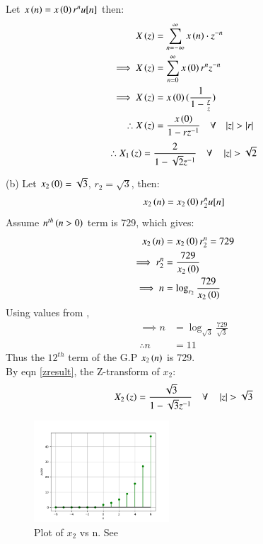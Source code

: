 \documentclass[journal,12pt,twocolumn]{IEEEtran}
\theoremstyle{remark}
\begin{document}
Let $x\left(n\right) = x\left(0\right)r^nu[n]$ then:
\begin{align}
    X\left(z\right) &= \sum_{n = -\infty}^{\infty}{x\left(n\right) \cdot z^{-n}}\\
    \implies X\left(z\right) &= \sum_{n = 0}^{\infty}{x\left(0\right)r^{n}z^{-n}}\\
    \implies X\left(z\right) &= x\left(0\right)(\frac{1}{1 - \frac{r}{z}})\\
	\therefore X\left(z\right) &= \frac{x\left(0\right)}{1 - rz^{-1}} \quad \forall \quad {\left\vert z\right\vert > \left\vert r\right\vert} \label{zresult}
\end{align}
\begin{align}
    \therefore X_1\left(z\right) = \frac{2}{1 - \sqrt{2}z^{-1}} \quad \forall \quad \left\vert z\right\vert > \sqrt{2}
\end{align}

(b) Let $x_2\left(0\right) = \sqrt{3}$, $r_2 = \sqrt{3}$, then:
\begin{align}
    x_2\left(n\right) = x_2\left(0\right) r_2^nu[n]
\end{align}
Assume $n^{th}\left(n > 0\right)$ term is 729, which gives: 
\begin{align}
    x_2\left(n\right) &= x_2\left(0\right) r_2^n = 729\\
    \implies r_2^n &= \frac{729}{x_2\left(0\right)}\\
    \implies n &= \log_{r_2}{\frac{729}{x_2\left(0\right)}}
\end{align}
Using values from ,
\begin{align}
    \implies n &= \log_{\sqrt{3}}{\frac{729}{\sqrt{3}}}\\
    \therefore n &= 11
\end{align}
Thus the $12^{th}$ term of the G.P $x_2\left(n\right)$ is 729. \\

By eqn \ref{zresult}, the Z-transform of $x_2$:
\begin{align}
    X_2\left(z\right) = \frac{\sqrt{3}}{1 - \sqrt{3}z^{-1}} \quad \forall \quad \left\vert z\right\vert > \sqrt{3} 
\end{align}

\begin{figure}[h!]
    \renewcommand\thefigure{2}
    \centering
    \includegraphics[width=0.45\textwidth]{figs/b.png}
    \caption[short]{Plot of $x_2$ vs n. See }
    \label{fig:img2}
\end{figure}
\end{document}
